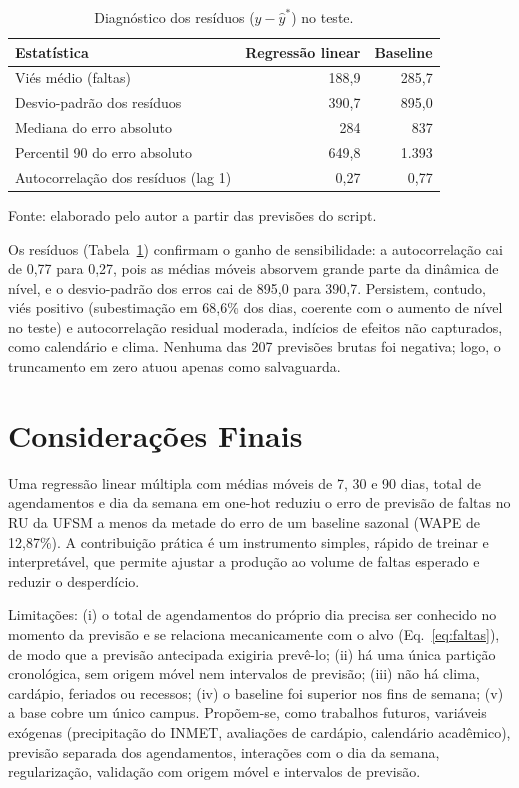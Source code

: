 \documentclass[11pt]{article}
\begin{document}
\begin{table}[htbp]
\centering
\small
\caption{Diagnóstico dos resíduos ($y-\hat{y}^{*}$) no teste.}
\label{tab:residuos}
\begin{tabular}{@{}lrr@{}}
\toprule
Estatística & Regressão linear & Baseline \\
\midrule
Viés médio (faltas) & 188,9 & 285,7 \\
Desvio-padrão dos resíduos & 390,7 & 895,0 \\
Mediana do erro absoluto & 284 & 837 \\
Percentil 90 do erro absoluto & 649,8 & 1.393 \\
Autocorrelação dos resíduos (lag 1) & 0,27 & 0,77 \\
\bottomrule
\end{tabular}
\begin{flushleft}\footnotesize Fonte: elaborado pelo autor a partir das previsões do script.\end{flushleft}
\end{table}

Os resíduos (Tabela~\ref{tab:residuos}) confirmam o ganho de sensibilidade: a autocorrelação cai de 0,77 para 0,27, pois as médias móveis absorvem grande parte da dinâmica de nível, e o desvio-padrão dos erros cai de 895,0 para 390,7. Persistem, contudo, viés positivo (subestimação em 68,6\% dos dias, coerente com o aumento de nível no teste) e autocorrelação residual moderada, indícios de efeitos não capturados, como calendário e clima. Nenhuma das 207 previsões brutas foi negativa; logo, o truncamento em zero atuou apenas como salvaguarda.

\section{Considerações Finais}

Uma regressão linear múltipla com médias móveis de 7, 30 e 90 dias, total de agendamentos e dia da semana em one-hot reduziu o erro de previsão de faltas no RU da UFSM a menos da metade do erro de um baseline sazonal (WAPE de 12,87\%). A contribuição prática é um instrumento simples, rápido de treinar e interpretável, que permite ajustar a produção ao volume de faltas esperado e reduzir o desperdício.

Limitações: (i) o total de agendamentos do próprio dia precisa ser conhecido no momento da previsão e se relaciona mecanicamente com o alvo (Eq.~\ref{eq:faltas}), de modo que a previsão antecipada exigiria prevê-lo; (ii) há uma única partição cronológica, sem origem móvel nem intervalos de previsão; (iii) não há clima, cardápio, feriados ou recessos; (iv) o baseline foi superior nos fins de semana; (v) a base cobre um único campus. Propõem-se, como trabalhos futuros, variáveis exógenas (precipitação do INMET, avaliações de cardápio, calendário acadêmico), previsão separada dos agendamentos, interações com o dia da semana, regularização, validação com origem móvel e intervalos de previsão.



\end{document}
